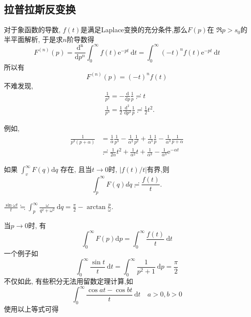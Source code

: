 \subsection{拉普拉斯反变换}
\label{subsec:inverse_laplace_transform}

对于象函数的导数, $f(t)$是满足Laplace变换的充分条件,那么$F(p)$在
$\Re p > s_0$的半平面解析,
于是求$n$阶导数得
$$
F^{(n)}(p)=\frac{\mathrm{d}^{\mathrm{n}}}{\mathrm{d} p^n} \int_0^{\infty} f(t) \mathrm{e}^{-p t} \mathrm{~d} t=\int_0^{\infty}(-t)^n f(t) \mathrm{e}^{-p t} \mathrm{~d} t
$$
所以有
\begin{equation}
    F^{(n)}(p)=(-t)^n f(t)
\end{equation}
不难发现,
\begin{equation}
    \begin{aligned}
    & \frac{1}{p^2}=-\frac{\mathrm{d}}{\mathrm{d} p} \frac{1}{p} \risingdotseq  t \\
    & \frac{1}{p^3}=\frac{1}{2} \frac{\mathrm{d}^2}{\mathrm{~d} p^2} \frac{1}{p} \risingdotseq \frac{1}{2} t^2 .
    \end{aligned}
\end{equation}

例如,
\begin{equation}
    \begin{aligned}
    \frac{1}{p^3(p+\alpha)} & =\frac{1}{\alpha} \frac{1}{p^3}-\frac{1}{\alpha^2} \frac{1}{p^2}+\frac{1}{\alpha^3} \frac{1}{p}-\frac{1}{\alpha^3} \frac{1}{p+\alpha} \\
    & \risingdotseq \frac{1}{2 \alpha} t^2+\frac{1}{\alpha^2} t+\frac{1}{\alpha^3}-\frac{1}{\alpha^3} \mathrm{e}^{-\alpha t}
    \end{aligned}
\end{equation}

如果 $\int_v^{\infty} F(q) \mathrm{d} q$ 存在, 且当$t\to 0$时, $|f(t)/t|$有界,则
\begin{equation}
    \int_{p}^{\infty} F(q) dq \risingdotseq \frac{f(t)}{t} . 
\end{equation}

$\frac{\sin \omega t}{t} \fallingdotseq \int_p^{\infty} \frac{\omega}{q^2+\omega^2} \mathrm{~d} q=\frac{\pi}{2}-\arctan \frac{p}{\omega}$.

当$p\to 0$时, 有
\begin{equation}
    \int_0^{\infty} F(p) \mathrm{d} p=\int_0^{\infty} \frac{f(t)}{t} \mathrm{~d} t
\end{equation}
一个例子如
$$
\int_0^{\infty} \frac{\sin t}{t} \mathrm{~d} t=\int_0^{\infty} \frac{1}{p^2+1} \mathrm{~d} p=\frac{\pi}{2}
$$
不仅如此, 有些积分无法用留数定理计算,如
$$
\int_0^{\infty} \frac{\cos a t-\cos b t}{t} \mathrm{~d} t \quad a>0, b>0
$$
使用以上等式可得


